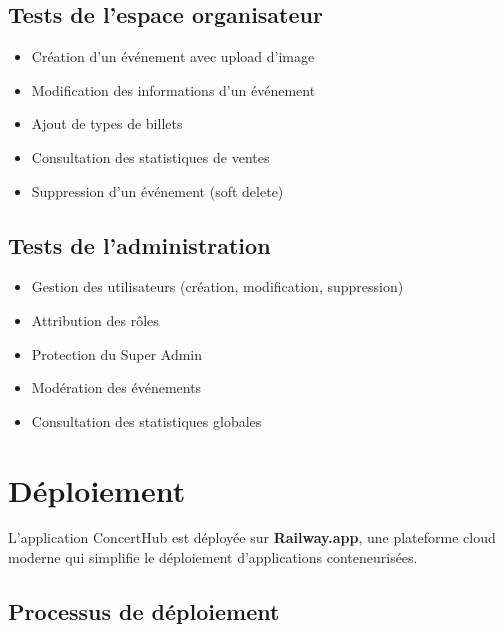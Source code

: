 \documentclass[a4paper,12pt,twoside]{report}
\begin{document}
\subsection{Tests de l'espace organisateur}
\begin{itemize}
    \item Création d'un événement avec upload d'image
    \item Modification des informations d'un événement
    \item Ajout de types de billets
    \item Consultation des statistiques de ventes
    \item Suppression d'un événement (soft delete)
\end{itemize}

\subsection{Tests de l'administration}
\begin{itemize}
    \item Gestion des utilisateurs (création, modification, suppression)
    \item Attribution des rôles
    \item Protection du Super Admin
    \item Modération des événements
    \item Consultation des statistiques globales
\end{itemize}

\section{Déploiement}

L'application ConcertHub est déployée sur \textbf{Railway.app}, une plateforme cloud moderne qui simplifie le déploiement d'applications conteneurisées.

\subsection{Processus de déploiement}
\end{document}
